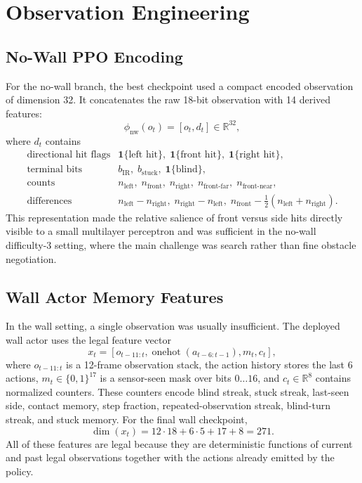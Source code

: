\documentclass[11pt, oneside]{article}   	%
\begin{document}
\section{Observation Engineering}

\subsection{No-Wall PPO Encoding}

For the no-wall branch, the best checkpoint used a compact encoded observation of
dimension 32. It concatenates the raw 18-bit observation with 14 derived features:
\[
  \phi_{\text{nw}}(o_t)=[o_t,d_t]\in\mathbb{R}^{32},
\]
where \(d_t\) contains
\[
\begin{array}{ll}
\text{directional hit flags} & \mathbf{1}\{\text{left hit}\},\; \mathbf{1}\{\text{front hit}\},\; \mathbf{1}\{\text{right hit}\},\\
\text{terminal bits} & b_{\text{IR}},\; b_{\text{stuck}},\; \mathbf{1}\{\text{blind}\},\\
\text{counts} & n_{\text{left}},\; n_{\text{front}},\; n_{\text{right}},\; n_{\text{front-far}},\; n_{\text{front-near}},\\
\text{differences} & n_{\text{left}}-n_{\text{right}},\; n_{\text{right}}-n_{\text{left}},\;
  n_{\text{front}}-\frac{1}{2}(n_{\text{left}}+n_{\text{right}}).
\end{array}
\]
This representation made the relative salience of front versus side hits directly visible
to a small multilayer perceptron and was sufficient in the no-wall difficulty-3 setting,
where the main challenge was search rather than fine obstacle negotiation.

\subsection{Wall Actor Memory Features}

In the wall setting, a single observation was usually insufficient. The deployed wall
actor uses the legal feature vector
\[
  x_t=
  [
    o_{t-11:t},
    \operatorname{onehot}(a_{t-6:t-1}),
    m_t,
    c_t
  ],
\]
where \(o_{t-11:t}\) is a 12-frame observation stack, the action history stores the last 6
actions, \(m_t\in\{0,1\}^{17}\) is a sensor-seen mask over bits \(0\ldots16\), and
\(c_t\in\mathbb{R}^8\) contains normalized counters. These counters encode blind streak,
stuck streak, last-seen side, contact memory, step fraction, repeated-observation
streak, blind-turn streak, and stuck memory.
For the final wall checkpoint,
\[
  \dim(x_t)=12\cdot18 + 6\cdot5 + 17 + 8 = 271.
\]
All of these features are legal because they are deterministic functions of current and
past legal observations together with the actions already emitted by the policy.
\end{document}
